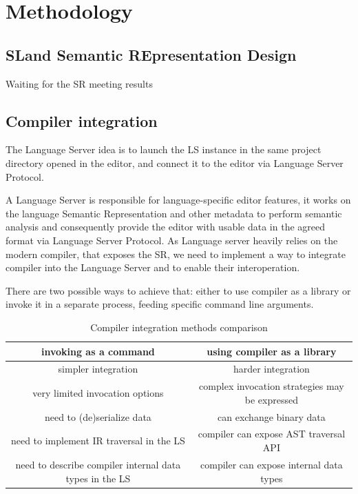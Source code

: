 \chapter{Methodology}
\label{chap:met}

\section{SLand Semantic REpresentation Design}
\label{sec:met:ir_design}
Waiting for the SR meeting results

\section{Compiler integration}
\label{sec:met:ls_compiler_interop}
The Language Server idea is to launch the LS instance in the same project directory
opened in the editor, and connect it to the editor via Language Server Protocol.

A Language Server is responsible for language-specific editor features, 
it works on the language Semantic Representation and other metadata 
to perform semantic analysis and consequently provide the editor with usable data in the agreed format via Language Server Protocol.
As Language server heavily relies on the modern compiler, that exposes the SR, 
we need to implement a way to integrate compiler into the Language Server and to enable their interoperation.

There are two possible ways to achieve that: either to use compiler as a library or invoke it in a separate process, 
feeding specific command line arguments.
\begin{table}[H]
    \centering
    \begin{tabular}{|c|c|}
        \hline
        \textbf{invoking as a command} & \textbf{using compiler as a library} \\
        \hline
        simpler integration & harder integration \\ 
        \hline
        very limited invocation options & complex invocation strategies may be expressed \\
        \hline
        need to (de)serialize data & can exchange binary data \\
        \hline
        need to implement IR traversal in the LS & compiler can expose AST traversal API \\
        \hline
        need to describe compiler internal data types in the LS & compiler can expose internal data types \\
        \hline 
    \end{tabular}
    \caption{Compiler integration methods comparison}
    \label{table:met:compiler_integration}
\end{table}

